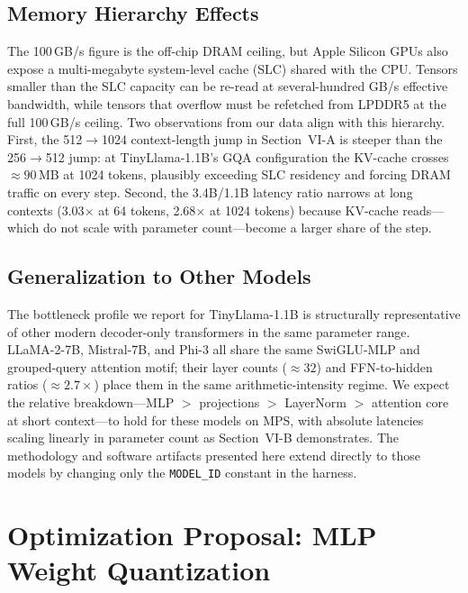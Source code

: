 \documentclass[conference]{IEEEtran}
\begin{document}
\subsection{Memory Hierarchy Effects}

The 100\,GB/s figure is the off-chip DRAM ceiling, but Apple Silicon
GPUs also expose a multi-megabyte system-level cache (SLC) shared with
the CPU. Tensors smaller than the SLC capacity can be re-read at
several-hundred GB/s effective bandwidth, while tensors that overflow
must be refetched from LPDDR5 at the full 100\,GB/s ceiling. Two
observations from our data align with this hierarchy. First, the
512$\to$1024 context-length jump in Section~VI-A is steeper than the
256$\to$512 jump: at TinyLlama-1.1B's GQA configuration the KV-cache
crosses ${\approx}90$\,MB at 1024 tokens, plausibly exceeding SLC
residency and forcing DRAM traffic on every step. Second, the
3.4B/1.1B latency ratio narrows at long contexts (3.03$\times$ at 64
tokens, 2.68$\times$ at 1024 tokens) because KV-cache reads---which do
not scale with parameter count---become a larger share of the step.

\subsection{Generalization to Other Models}

The bottleneck profile we report for TinyLlama-1.1B is structurally
representative of other modern decoder-only transformers in the same
parameter range. LLaMA-2-7B, Mistral-7B, and Phi-3 all share the same
SwiGLU-MLP and grouped-query attention motif; their layer counts
(${\approx}32$) and FFN-to-hidden ratios (${\approx}2.7\times$) place
them in the same arithmetic-intensity regime. We expect the relative
breakdown---MLP $>$ projections $>$ LayerNorm $>$ attention core at
short context---to hold for these models on MPS, with absolute
latencies scaling linearly in parameter count as Section~VI-B
demonstrates. The methodology and software artifacts presented here
extend directly to those models by changing only the
\texttt{MODEL\_ID} constant in the harness.

\section{Optimization Proposal: MLP Weight Quantization}
\end{document}
